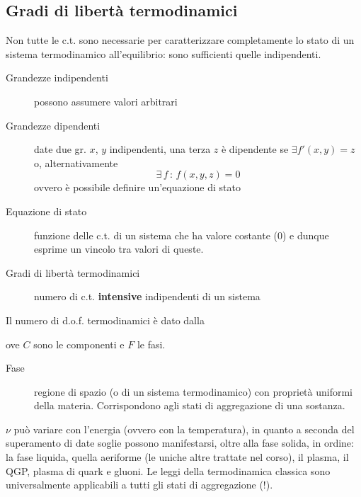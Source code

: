 \documentclass[10pt, oneside]{book}
\begin{document}
\subsection{Gradi di libertà termodinamici}
Non tutte le c.t. sono necessarie per caratterizzare completamente lo stato di un sistema termodinamico all'equilibrio: sono sufficienti quelle indipendenti.
\begin{description}
\item[Grandezze indipendenti] possono assumere valori arbitrari
\item[Grandezze dipendenti] date due gr. $x$, $y$ indipendenti, una terza $z$ è dipendente se $\exists f'(x,y) = z$ o, alternativamente
\[\exists \, f \, : \, f(x,y,z) = 0\]
ovvero è possibile definire un'equazione di stato
\item[Equazione di stato] funzione delle c.t. di un sistema che ha valore costante ($0$) e dunque esprime un vincolo tra valori di queste.
\item[Gradi di libertà termodinamici] numero di c.t. \textbf{intensive} indipendenti di un sistema
\end{description}
Il numero di d.o.f. termodinamici è dato dalla 
\begin{center}

\end{center}
ove $C$ sono le componenti e $F$ le fasi.
\begin{description}
\item[Fase] regione di spazio (o di un sistema termodinamico) con proprietà uniformi della materia. Corrispondono agli stati di aggregazione di una sostanza.
\end{description}
$\nu$ può variare con l'energia (ovvero con la temperatura), in quanto a seconda del superamento di date soglie possono manifestarsi, oltre alla fase solida, in ordine: la fase liquida, quella aeriforme (le uniche altre trattate nel corso), il plasma, il QGP, plasma di quark e gluoni. Le leggi della termodinamica classica sono universalmente applicabili a tutti gli stati di aggregazione (!).
\end{document}

